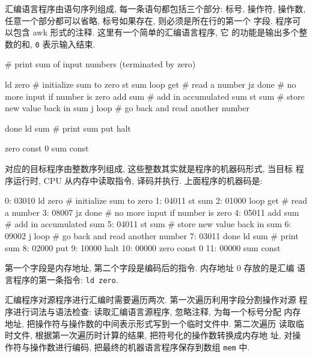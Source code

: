 汇编语言程序由语句序列组成, 每一条语句都包括三个部分: 标号, 操作符, 
操作数, 任意一个部分都可以省略, 标号如果存在, 则必须是所在行的第一个
字段. 程序可以包含 awk 形式的注释. 这里有一个简单的汇编语言程序, 它
的功能是输出多个整数的和, \texttt{0} 表示输入结束.
\begin{awkcode}
    # print sum of input numbers (terminated by zero)

         ld    zero   # initialize sum to zero
         st    sum
    loop get          # read a number
         jz    done   # no more input if number is zero
         add   sum    # add in accumulated sum
         st    sum    # store new value back in sum
         j     loop   # go back and read another number

    done ld    sum    # print sum
         put
         halt

    zero const 0
    sum  const
\end{awkcode}

对应的目标程序由整数序列组成, 这些整数其实就是程序的机器码形式, 当目标
程序运行时, CPU 从内存中读取指令, 译码并执行. 上面程序的机器码是:
\begin{awkcode}
     0: 03010           ld      zero    # initialize sum to zero
     1: 04011           st      sum
     2: 01000      loop get             # read a number
     3: 08007           jz      done    # no more input if number is zero
     4: 05011           add     sum     # add in accumulated sum
     5: 04011           st      sum     # store new value back in sum
     6: 09002           j       loop    # go back and read another number
     7: 03011      done ld      sum     # print sum
     8: 02000           put
     9: 10000           halt
    10: 00000      zero const 0
    11: 00000      sum  const
\end{awkcode}
第一个字段是内存地址, 第二个字段是编码后的指令. 内存地址 0 存放的是汇编
语言程序的第一条指令: \texttt{ld zero}.

汇编程序对源程序进行汇编时需要遍历两次. 第一次遍历利用字段分割操作对源
程序进行词法与语法检查: 读取汇编语言源程序, 忽略注释, 为每一个标号分配
内存地址, 把操作符与操作数的中间表示形式写到一个临时文件中. 第二次遍历
读取临时文件, 根据第一次遍历时计算的结果, 把符号化的操作数转换成内存地
址, 对操作符与操作数进行编码, 把最终的机器语言程序保存到数组 \texttt{mem}
中.

